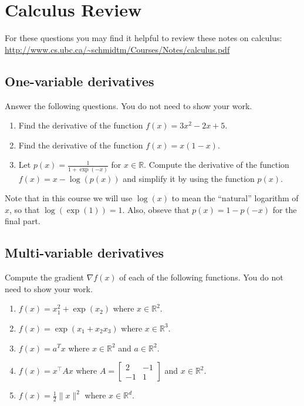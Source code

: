 \documentclass{article}
\def\blu#1{{\color{blu}#1}}
\def\norm#1{\|#1\|}
\def\R{\mathbb{R}}
\begin{document}
\section{Calculus Review}

For these questions you may find it helpful to review these notes on calculus:\\
\url{http://www.cs.ubc.ca/~schmidtm/Courses/Notes/calculus.pdf}\\


\subsection{One-variable derivatives}

\blu{Answer the following questions.} You do not need to show your work.

\begin{enumerate}
\item Find the derivative of the function $f(x) = 3x^2 -2x + 5$.
\item Find the derivative of the function $f(x) = x(1-x)$.
\item Let $p(x) = \frac{1}{1+\exp(-x)}$ for $x \in \R$. Compute the derivative of the function $f(x) = x-\log(p(x))$ and simplify it by using the function $p(x)$.
\end{enumerate}
Note that in this course we will use $\log(x)$ to mean the ``natural'' logarithm of $x$, so that $\log(\exp(1)) = 1$. Also, obseve that $p(x) = 1-p(-x)$ for the final part.

\subsection{Multi-variable derivatives}

\blu{Compute the gradient $\nabla f(x)$ of each of the following functions.} You do not need to show your work.
\begin{enumerate}
\item $f(x) = x_1^2 + \exp(x_2)$ where $x \in \R^2$.
\item $f(x) = \exp(x_1 + x_2x_3)$ where $x \in \mathbb{R}^3$.
\item $f(x) = a^Tx$ where $x \in \R^2$ and $a \in \R^2$.
\item $f(x) = x^\top A x$ where $A=\left[ \begin{array}{cc}
2 & -1 \\
 -1 & 1 \end{array} \right]$ and $x \in \mathbb{R}^2$.
 \item $f(x) = \frac{1}{2}\norm{x}^2$ where $x \in \R^d$.
\end{enumerate}
\end{document}
